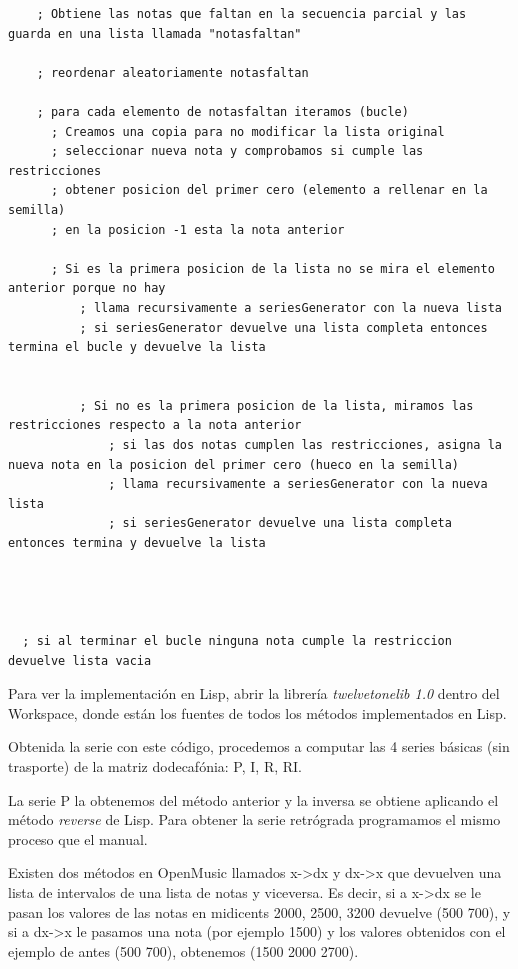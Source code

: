 \documentclass[a4paper,openany,12pt]{memoir}
\begin{document}
   \lstset{language=Lisp,
           basicstyle=\ttfamily\scriptsize,
           keywordstyle=\ttfamily,
           stringstyle=\ttfamily,
           commentstyle=\ttfamily,
          breaklines=true
          }
\begin{lstlisting}
    ; Obtiene las notas que faltan en la secuencia parcial y las guarda en una lista llamada "notasfaltan"

    ; reordenar aleatoriamente notasfaltan

  	; para cada elemento de notasfaltan iteramos (bucle)
      ; Creamos una copia para no modificar la lista original
      ; seleccionar nueva nota y comprobamos si cumple las restricciones
      ; obtener posicion del primer cero (elemento a rellenar en la semilla)
      ; en la posicion -1 esta la nota anterior
      
      ; Si es la primera posicion de la lista no se mira el elemento anterior porque no hay
          ; llama recursivamente a seriesGenerator con la nueva lista
          ; si seriesGenerator devuelve una lista completa entonces termina el bucle y devuelve la lista


          ; Si no es la primera posicion de la lista, miramos las restricciones respecto a la nota anterior
              ; si las dos notas cumplen las restricciones, asigna la nueva nota en la posicion del primer cero (hueco en la semilla)
              ; llama recursivamente a seriesGenerator con la nueva lista
              ; si seriesGenerator devuelve una lista completa entonces termina y devuelve la lista




  ; si al terminar el bucle ninguna nota cumple la restriccion devuelve lista vacia

\end{lstlisting}

Para ver la implementación en Lisp, abrir la librería \emph{twelvetonelib 1.0} dentro del Workspace, donde están los fuentes de todos los métodos implementados en Lisp.

Obtenida la serie con este código, procedemos a computar las 4 series básicas (sin trasporte) de la matriz dodecafónia: P, I, R, RI.

La serie P la obtenemos del método anterior y la inversa se obtiene aplicando el método \emph{reverse} de Lisp. Para obtener la serie retrógrada programamos el mismo proceso que el manual.

Existen dos métodos en OpenMusic llamados x->dx y dx->x que devuelven una lista de intervalos de una lista de notas y viceversa. Es decir, si a x->dx se le pasan los valores de las notas en midicents 2000, 2500, 3200 devuelve (500 700), y si a dx->x le pasamos una nota (por ejemplo 1500) y los valores obtenidos con el ejemplo de antes (500 700), obtenemos (1500 2000 2700).
\end{document}
